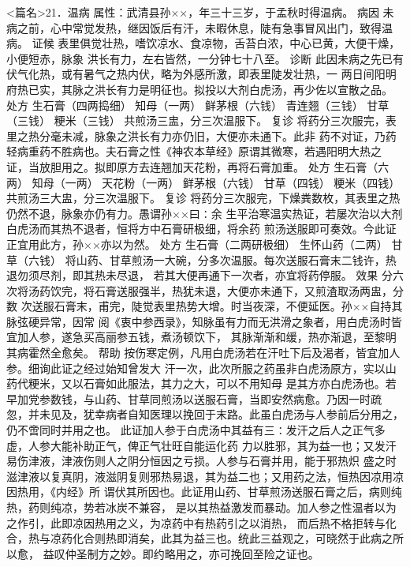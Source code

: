 \documentclass[a4paper,12pt,UTF8,twoside]{ctexbook}
\begin{document}
<篇名>21．温病
属性：武清县孙××，年三十三岁，于孟秋时得温病。 
病因 未病之前，心中常觉发热，继因饭后有汗，未暇休息，陡有急事冒风出门，致得温病。 
证候 表里俱觉壮热，嗜饮凉水、食凉物，舌苔白浓，中心已黄，大便干燥，小便短赤，脉象 
洪长有力，左右皆然，一分钟七十八至。 
诊断 此因未病之先已有伏气化热，或有暑气之热内伏，略为外感所激，即表里陡发壮热，一 
两日间阳明府热已实，其脉之洪长有力是明征也。拟投以大剂白虎汤，再少佐以宣散之品。 
处方 生石膏（四两捣细） 知母（一两） 鲜茅根（六钱） 青连翘（三钱） 
甘草（三钱） 粳米（三钱） 
共煎汤三盅，分三次温服下。 
复诊 将药分三次服完，表里之热分毫未减，脉象之洪长有力亦仍旧，大便亦未通下。此非 
药不对证，乃药轻病重药不胜病也。夫石膏之性《神农本草经》原谓其微寒，若遇阳明大热之 
证，当放胆用之。拟即原方去连翘加天花粉，再将石膏加重。 
处方 生石膏（六两） 知母（一两） 天花粉（一两） 鲜茅根（六钱） 
甘草（四钱） 粳米（四钱） 
共煎汤三大盅，分三次温服下。 
复诊 将药分三次服完，下燥粪数枚，其表里之热仍然不退，脉象亦仍有力。愚谓孙××曰∶余 
生平治寒温实热证，若屡次治以大剂白虎汤而其热不退者，恒将方中石膏研极细，将余药 
煎汤送服即可奏效。今此证正宜用此方，孙××亦以为然。 
处方 生石膏（二两研极细） 生怀山药（二两） 甘草（六钱） 
将山药、甘草煎汤一大碗，分多次温服。每次送服石膏末二钱许，热退勿须尽剂，即其热未尽退， 
若其大便再通下一次者，亦宜将药停服。 
效果 分六次将汤药饮完，将石膏送服强半，热犹未退，大便亦未通下，又煎渣取汤两盅，分数 
次送服石膏末，甫完，陡觉表里热势大增。时当夜深，不便延医。孙××自持其脉弦硬异常，因常 
阅《衷中参西录》，知脉虽有力而无洪滑之象者，用白虎汤时皆宜加人参，遂急买高丽参五钱，煮汤顿饮下， 
其脉渐渐和缓，热亦渐退，至黎明其病霍然全愈矣。 
帮助 按伤寒定例，凡用白虎汤若在汗吐下后及渴者，皆宜加人参。细询此证之经过始知曾发大 
汗一次，此次所服之药虽非白虎汤原方，实以山药代粳米，又以石膏如此服法，其力之大，可以不用知母 
是其方亦白虎汤也。若早加党参数钱，与山药、甘草同煎汤以送服石膏，当即安然病愈。乃因一时疏 
忽，并未见及，犹幸病者自知医理以挽回于末路。此虽白虎汤与人参前后分用之，仍不啻同时并用之也。 
此证加人参于白虎汤中其益有三∶发汗之后人之正气多虚，人参大能补助正气，俾正气壮旺自能运化药 
力以胜邪，其为益一也；又发汗易伤津液，津液伤则人之阴分恒因之亏损。人参与石膏并用，能于邪热炽 
盛之时滋津液以复真阴，液滋阴复则邪热易退，其为益二也；又用药之法，恒热因凉用凉因热用，《内经》所 
谓伏其所因也。此证用山药、甘草煎汤送服石膏之后，病则纯热，药则纯凉，势若冰炭不兼容， 
是以其热益激发而暴动。加人参之性温者以为之作引，此即凉因热用之义，为凉药中有热药引之以消热， 
而后热不格拒转与化合，热与凉药化合则热即消矣，此其为益三也。统此三益观之，可晓然于此病之所以愈， 
益叹仲圣制方之妙。即约略用之，亦可挽回至险之证也。 
\end{document}
